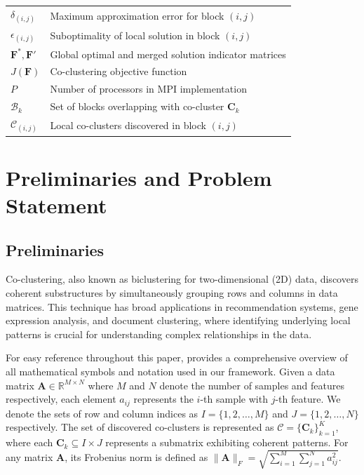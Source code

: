 \documentclass[journal]{IEEEtran}
\begin{document}
{\begin{table}[htbp]
\begin{tabular}{@{} p{} p{} @{}}
                $\delta_{(i,j)}$                   & Maximum approximation error for block $(i,j)$                                   \\
                $\epsilon_{(i,j)}$                 & Suboptimality of local solution in block $(i,j)$                                \\
                $\mathbf{F}^*, \mathbf{F}'$        & Global optimal and merged solution indicator matrices                           \\
                $J(\mathbf{F})$                    & Co-clustering objective function                                                \\
                $P$                                & Number of processors in MPI implementation                                      \\
                $\mathcal{B}_k$                    & Set of blocks overlapping with co-cluster $\mathbf{C}_k$                        \\
                $\mathcal{C}_{(i,j)}$              & Local co-clusters discovered in block $(i,j)$                                   \\
                \bottomrule
            \end{tabular}
        \end{table}
    }

\section{Preliminaries and Problem Statement}
\label{sec:problem-formulation}
\subsection{Preliminaries}
Co-clustering, also known as biclustering for two-dimensional (2D) data, discovers coherent substructures by simultaneously grouping rows and columns in data matrices. This technique has broad applications in recommendation systems, gene expression analysis, and document clustering, where identifying underlying local patterns is crucial for understanding complex relationships in the data.

    {\color{blue} For easy reference throughout this paper,  provides a comprehensive overview of all mathematical symbols and notation used in our framework.} Given a data matrix $\mathbf{A} \in \mathbb{R}^{M \times N}$ where $M$ and $N$ denote the number of samples and features respectively, each element $a_{ij}$ represents the $i$-th sample with $j$-th feature. We denote the sets of row and column indices as $I = \{1,2,\ldots,M\}$ and $J = \{1,2,\ldots,N\}$ respectively. The set of discovered co-clusters is represented as $\mathcal{C} = \{\mathbf{C}_k\}_{k=1}^K$, where each $\mathbf{C}_k \subseteq I \times J$ represents a submatrix exhibiting coherent patterns. For any matrix $\mathbf{A}$, its Frobenius norm is defined as $\|\mathbf{A}\|_F = \sqrt{\sum_{i=1}^M \sum_{j=1}^N a_{ij}^2}$.
\end{document}
